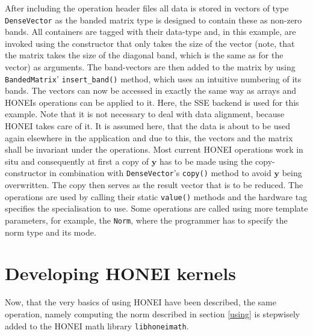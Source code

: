 \documentclass{article}
\begin{document}
After including the operation header files all data is stored in vectors of type \texttt{DenseVector} as the banded matrix type is designed
to contain these as non-zero bands. All containers are tagged with their data-type and, in this example, are invoked using the constructor that only takes the size of the vector (note, that the matrix takes the size of the diagonal band, which is the same as for the vector) as arguments.
The band-vectors are then added to the matrix by using \texttt{BandedMatrix}' \texttt{insert\_band()} method, which uses an intuitive numbering of its bands. The vectors can now be accessed in exactly the same way as arrays and HONEIs operations can be applied to it. Here, the SSE backend is used for this example.
Note that it is not necessary to deal with data alignment, because HONEI takes care of it. It is assumed here, that the data is about to be used again elsewhere in the application and due to this, the vectors and the matrix shall be invariant under the operations. Most current HONEI operations work in situ and consequently at first a copy of $\mathbf{y}$ has to be made using the copy-constructor in combination with \texttt{DenseVector}'s \texttt{copy()} method to avoid $\mathbf{y}$ being overwritten. The copy then serves as the result vector that is to be reduced. The operations are used by calling their static \texttt{value()} methods and the hardware tag specifies the specialisation to use. Some operations are called using more template parameters, for example, the \texttt{Norm}, where the programmer has to specify the norm type and its mode.

\FloatBarrier
\section{Developing HONEI kernels}\label{developing}
Now, that the very basics of using HONEI have been described, the same operation, namely computing the norm described in section \ref{using} is stepwisely added to the HONEI math library \texttt{libhoneimath}.

\FloatBarrier
\end{document}
